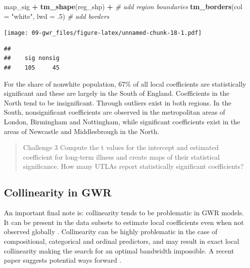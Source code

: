 \documentclass[
]{book}
\newenvironment{Shaded}{\begin{snugshade}}{\end{snugshade}}
\newcommand{\CommentTok}[1]{\textcolor[rgb]{0.56,0.35,0.01}{\textit{#1}}}
\newcommand{\DataTypeTok}[1]{\textcolor[rgb]{0.13,0.29,0.53}{#1}}
\newcommand{\FloatTok}[1]{\textcolor[rgb]{0.00,0.00,0.81}{#1}}
\newcommand{\KeywordTok}[1]{\textcolor[rgb]{0.13,0.29,0.53}{\textbf{#1}}}
\newcommand{\NormalTok}[1]{#1}
\newcommand{\OperatorTok}[1]{\textcolor[rgb]{0.81,0.36,0.00}{\textbf{#1}}}
\newcommand{\StringTok}[1]{\textcolor[rgb]{0.31,0.60,0.02}{#1}}
\begin{document}
\begin{Shaded}
\begin{Highlighting}[]
\NormalTok{map_sig }\OperatorTok{+}\StringTok{ }\KeywordTok{tm_shape}\NormalTok{(reg_shp) }\OperatorTok{+}\StringTok{ }\CommentTok{# add region boundaries}
\StringTok{  }\KeywordTok{tm_borders}\NormalTok{(}\DataTypeTok{col =} \StringTok{"white"}\NormalTok{, }\DataTypeTok{lwd =} \FloatTok{.5}\NormalTok{) }\CommentTok{# add borders}
\end{Highlighting}
\end{Shaded}

\texttt{[image: 09-gwr\_files/figure-latex/unnamed-chunk-18-1.pdf]}

\begin{Shaded}
\end{Shaded}

\begin{verbatim}
## 
##    sig nonsig 
##    105     45
\end{verbatim}

For the share of nonwhite population, 67\% of all local coefficients are statistically significant and these are largely in the South of England. Coefficients in the North tend to be insignificant. Through outliers exist in both regions. In the South, nonsignificant coefficients are observed in the metropolitan areas of London, Birmingham and Nottingham, while significant coefficients exist in the areas of Newcastle and Middlesbrough in the North.

\begin{quote}
Challenge 3
Compute the t values for the intercept and estimated coefficient for long-term illness and create maps of their statistical significance.
How many UTLAs report statistically significant coefficients?
\end{quote}

\hypertarget{collinearity-in-gwr}{%
\subsection{Collinearity in GWR}\label{collinearity-in-gwr}}

An important final note is: collinearity tends to be problematic in GWR models. It can be present in the data subsets to estimate local coefficients even when not observed globally \citet{wheeler2005multicollinearity}. Collinearity can be highly problematic in the case of compositional, categorical and ordinal predictors, and may result in exact local collinearity making the search for an optimal bandwidth impossible. A recent paper suggests potential ways forward \citep{comber2020gwr}.
\end{document}
